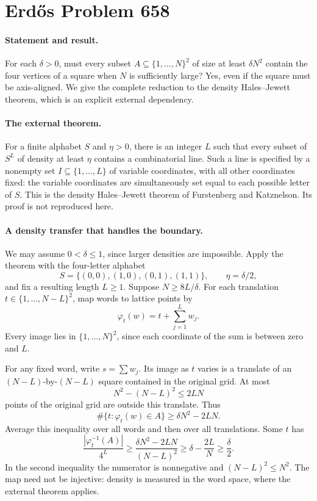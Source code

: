\section*{Erd\H{o}s Problem 658}

\paragraph{Statement and result.}
For each \(\delta>0\), must every subset \(A\subseteq\{1,\ldots,N\}^2\) of size at least \(\delta N^2\) contain the four vertices of a square when \(N\) is sufficiently large? Yes, even if the square must be axis-aligned. We give the complete reduction to the density Hales--Jewett theorem, which is an explicit external dependency.

\paragraph{The external theorem.}
For a finite alphabet \(S\) and \(\eta>0\), there is an integer \(L\) such that every subset of \(S^L\) of density at least \(\eta\) contains a combinatorial line. Such a line is specified by a nonempty set \(I\subseteq\{1,\ldots,L\}\) of variable coordinates, with all other coordinates fixed: the variable coordinates are simultaneously set equal to each possible letter of \(S\). This is the density Hales--Jewett theorem of Furstenberg and Katznelson. Its proof is not reproduced here.

\paragraph{A density transfer that handles the boundary.}
We may assume \(0<\delta\leq1\), since larger densities are impossible. Apply the theorem with the four-letter alphabet
\[
 S=\{(0,0),(1,0),(0,1),(1,1)\},\qquad \eta=\delta/2,
\]
and fix a resulting length \(L\geq1\). Suppose \(N\geq8L/\delta\). For each translation \(t\in\{1,\ldots,N-L\}^2\), map words to lattice points by
\[
 \varphi_t(w)=t+\sum_{j=1}^L w_j.
\]
Every image lies in \(\{1,\ldots,N\}^2\), since each coordinate of the sum is between zero and \(L\).

For any fixed word, write \(s=\sum w_j\). Its image as \(t\) varies is a translate of an \((N-L)\)-by-\((N-L)\) square contained in the original grid. At most
\[
 N^2-(N-L)^2\leq2LN
\]
points of the original grid are outside this translate. Thus
\[
 \#\{t:\varphi_t(w)\in A\}\geq\delta N^2-2LN.
\]
Average this inequality over all words and then over all translations. Some \(t\) has
\[
 \frac{|\varphi_t^{-1}(A)|}{4^L}
 \geq\frac{\delta N^2-2LN}{(N-L)^2}
 \geq\delta-\frac{2L}{N}\geq\frac\delta2. \tag{1}
\]
In the second inequality the numerator is nonnegative and \((N-L)^2\leq N^2\). The map need not be injective: density is measured in the word space, where the external theorem applies.

